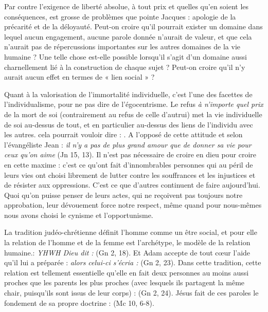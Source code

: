  Par contre l'exigence de liberté absolue, à tout prix et quelles qu'en soient les conséquences, est grosse de problèmes que pointe Jacques  : apologie de la précarité et de la déloyauté. Peut-on croire qu'il pourrait exister un domaine  dans lequel aucun engagement, aucune parole donnée n'aurait de valeur, et que cela n'aurait pas de répercussions importantes sur les autres domaines de la vie humaine ? Une telle chose est-elle possible lorsqu'il s'agit d'un domaine aussi charnellement lié à la construction de chaque sujet ? Peut-on croire qu'il n'y aurait aucun effet en termes de « lien social » ?
 
 Quant à la valorisation de l'immortalité individuelle, c'est l'une des facettes de l'individualisme, pour ne pas dire de l'égocentrisme. Le refus \emph{à n'importe quel prix} de la mort de soi (contrairement au refus de celle d'autrui) met la vie individuelle de soi au-dessus de tout, et en particulier au-dessus des liens de l'individu avec les autres.  cela pourrait vouloir dire : . A l'opposé de cette attitude et selon  l'évangéliste Jean : \emph{il n'y a pas de plus grand amour que de donner sa vie pour ceux qu'on aime} (Jn 15, 13). Il n'est pas nécessaire de croire en dieu pour croire en cette maxime : c'est ce qu'ont fait d'innombrables personnes qui au péril de leurs vies ont choisi librement de lutter contre les souffrances et les injustices et de résister aux oppressions. C'est ce que d'autres continuent de faire aujourd'hui. Quoi qu'on puisse penser de leurs actes, qui ne reçoivent pas toujours notre approbation, leur dévouement force notre respect, même quand pour nous-mêmes nous avons choisi  le cynisme et l'opportunisme.
 
 La tradition judéo-chrétienne définit l'homme comme un être social, et pour elle la relation de l'homme et de la femme est l'archétype, le modèle de la relation humaine.: \emph{YHWH Dieu dit : } (Gn 2, 18). Et Adam accepte de tout cœur l'aide qu'il lui a préparée : \emph{alors celui-ci s'écria : } (Gn 2, 23). Dans cette tradition, cette relation est tellement essentielle qu'elle en fait deux personnes au moins aussi proches que les parents les plus proches (avec lesquels ils partagent la même chair, puisqu'ils sont issus de leur corps) :  (Gn 2, 24). Jésus fait de ces paroles le fondement de sa propre doctrine :
 (Mc 10, 6-8).

